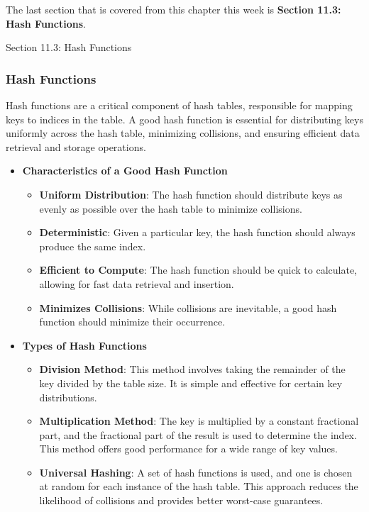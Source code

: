 The last section that is covered from this chapter this week is \textbf{Section 11.3: Hash Functions}.

\begin{notes}{Section 11.3: Hash Functions}
    \subsubsection*{Hash Functions}

    Hash functions are a critical component of hash tables, responsible for mapping keys to indices in the table. A good hash function is essential for distributing keys uniformly across the hash table, 
    minimizing collisions, and ensuring efficient data retrieval and storage operations.
    
    \begin{itemize}
        \item \textbf{Characteristics of a Good Hash Function}
        \begin{itemize}
            \item \textbf{Uniform Distribution}: The hash function should distribute keys as evenly as possible over the hash table to minimize collisions.
            \item \textbf{Deterministic}: Given a particular key, the hash function should always produce the same index.
            \item \textbf{Efficient to Compute}: The hash function should be quick to calculate, allowing for fast data retrieval and insertion.
            \item \textbf{Minimizes Collisions}: While collisions are inevitable, a good hash function should minimize their occurrence.
        \end{itemize}
        
        \item \textbf{Types of Hash Functions}
        \begin{itemize}
            \item \textbf{Division Method}: This method involves taking the remainder of the key divided by the table size. It is simple and effective for certain key distributions.
            \item \textbf{Multiplication Method}: The key is multiplied by a constant fractional part, and the fractional part of the result is used to determine the index. This method offers good 
            performance for a wide range of key values.
            \item \textbf{Universal Hashing}: A set of hash functions is used, and one is chosen at random for each instance of the hash table. This approach reduces the likelihood of collisions and 
            provides better worst-case guarantees.
        \end{itemize}
        

\end{itemize}
\end{notes}
